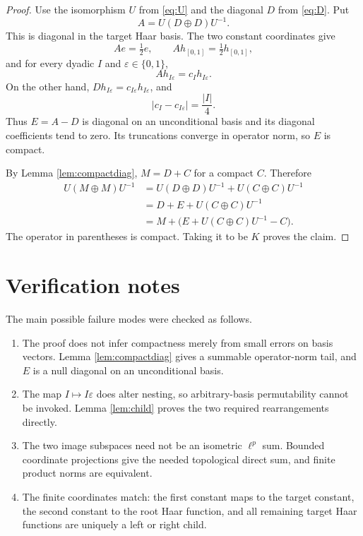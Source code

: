 \documentclass[11pt]{article}
\begin{document}
\begin{proof}
Use the isomorphism $U$ from \eqref{eq:U} and the diagonal $D$ from
\eqref{eq:D}. Put
\[
  A=U(D\oplus D)U^{-1}.
\]
This is diagonal in the target Haar basis. The two constant coordinates give
\[
  Ae=\tfrac12e,
  \qquad Ah_{[0,1]}=\tfrac12h_{[0,1]},
\]
and for every dyadic $I$ and $\varepsilon\in\{0,1\}$,
\[
  Ah_{I\varepsilon}=c_Ih_{I\varepsilon}.
\]
On the other hand, $Dh_{I\varepsilon}=c_{I\varepsilon}h_{I\varepsilon}$, and
\[
 |c_I-c_{I\varepsilon}|=\frac{|I|}{4}.
\]
Thus $E=A-D$ is diagonal on an unconditional basis and its diagonal
coefficients tend to zero. Its truncations converge in operator norm, so $E$
is compact.

By Lemma \ref{lem:compactdiag}, $M=D+C$ for a compact $C$. Therefore
\begin{align*}
 U(M\oplus M)U^{-1}
 &=U(D\oplus D)U^{-1}+U(C\oplus C)U^{-1}\\
 &=D+E+U(C\oplus C)U^{-1}\\
 &=M+\bigl(E+U(C\oplus C)U^{-1}-C\bigr).
\end{align*}
The operator in parentheses is compact. Taking it to be $K$ proves the
claim.
\end{proof}

\section{Verification notes}

The main possible failure modes were checked as follows.
\begin{enumerate}[leftmargin=*]
\item The proof does not infer compactness merely from small errors on basis
vectors. Lemma \ref{lem:compactdiag} gives a summable operator-norm tail, and
$E$ is a null diagonal on an unconditional basis.
\item The map $I\mapsto I\varepsilon$ does alter nesting, so arbitrary-basis
permutability cannot be invoked. Lemma \ref{lem:child} proves the two required
rearrangements directly.
\item The two image subspaces need not be an isometric $\ell^p$ sum. Bounded
coordinate projections give the needed topological direct sum, and finite
product norms are equivalent.
\item The finite coordinates match: the first constant maps to the target
constant, the second constant to the root Haar function, and all remaining
target Haar functions are uniquely a left or right child.
\end{enumerate}
\end{document}
